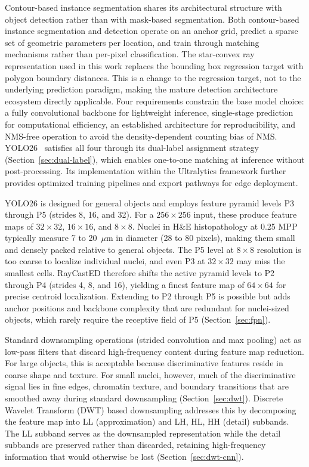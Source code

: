 Contour-based instance segmentation shares its architectural structure with object detection rather than with mask-based segmentation. Both contour-based instance segmentation and detection operate on an anchor grid, predict a sparse set of geometric parameters per location, and train through matching mechanisms rather than per-pixel classification. The star-convex ray representation used in this work replaces the bounding box regression target with polygon boundary distances. This is a change to the regression target, not to the underlying prediction paradigm, making the mature detection architecture ecosystem directly applicable. Four requirements constrain the base model choice: a fully convolutional backbone for lightweight inference, single-stage prediction for computational efficiency, an established architecture for reproducibility, and NMS-free operation to avoid the density-dependent counting bias of NMS. YOLO26~\cite{sapkota2025yolo26} satisfies all four through its dual-label assignment strategy (Section~\ref{sec:dual-label}), which enables one-to-one matching at inference without post-processing. Its implementation within the Ultralytics framework further provides optimized training pipelines and export pathways for edge deployment.

YOLO26 is designed for general objects and employs feature pyramid levels P3 through P5 (strides 8, 16, and 32). For a $256 \times 256$ input, these produce feature maps of $32 \times 32$, $16 \times 16$, and $8 \times 8$. Nuclei in H\&E histopathology at 0.25 MPP typically measure 7 to 20~$\mu$m in diameter (28 to 80 pixels), making them small and densely packed relative to general objects. The P5 level at $8 \times 8$ resolution is too coarse to localize individual nuclei, and even P3 at $32 \times 32$ may miss the smallest cells. RayCastED therefore shifts the active pyramid levels to P2 through P4 (strides 4, 8, and 16), yielding a finest feature map of $64 \times 64$ for precise centroid localization. Extending to P2 through P5 is possible but adds anchor positions and backbone complexity that are redundant for nuclei-sized objects, which rarely require the receptive field of P5 (Section~\ref{sec:fpn}).

Standard downsampling operations (strided convolution and max pooling) act as low-pass filters that discard high-frequency content during feature map reduction. For large objects, this is acceptable because discriminative features reside in coarse shape and texture. For small nuclei, however, much of the discriminative signal lies in fine edges, chromatin texture, and boundary transitions that are smoothed away during standard downsampling (Section~\ref{sec:dwt}). Discrete Wavelet Transform (DWT) based downsampling addresses this by decomposing the feature map into LL (approximation) and LH, HL, HH (detail) subbands. The LL subband serves as the downsampled representation while the detail subbands are preserved rather than discarded, retaining high-frequency information that would otherwise be lost (Section~\ref{sec:dwt-cnn}).

